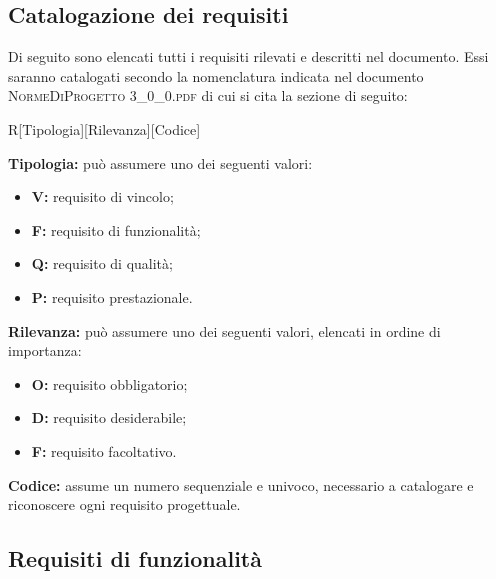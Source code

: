 \subsection{Catalogazione dei requisiti}

Di seguito sono elencati tutti i requisiti rilevati e descritti nel documento. Essi saranno catalogati secondo la nomenclatura indicata nel documento \textsc{NormeDiProgetto 3\_0\_0.pdf} di cui si cita la sezione di seguito:

\begin{center}
	R[Tipologia][Rilevanza][Codice]
\end{center}
\textbf{Tipologia:} può assumere uno dei seguenti valori:
\begin{itemize}
	\item \textbf{V:} requisito di vincolo;
	\item \textbf{F:} requisito di funzionalità;
	\item \textbf{Q:} requisito di qualità;
	\item \textbf{P:} requisito prestazionale.
\end{itemize}
\textbf{Rilevanza:} può assumere uno dei seguenti valori, elencati in ordine di importanza:
\begin{itemize}
	\item \textbf{O:} requisito obbligatorio;
	\item \textbf{D:} requisito desiderabile;
	\item \textbf{F:} requisito facoltativo.
\end{itemize}
\textbf{Codice:} assume un numero sequenziale e univoco, necessario a catalogare e riconoscere ogni requisito progettuale.

\subsection{Requisiti di funzionalità}

